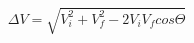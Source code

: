 \begin{equation*}
\Delta V = \sqrt{V_{i}^{2} + V_{f}^{2} - 2V_{i}V_{f}cos \Theta} \tag{4.74}
\end{equation*}
